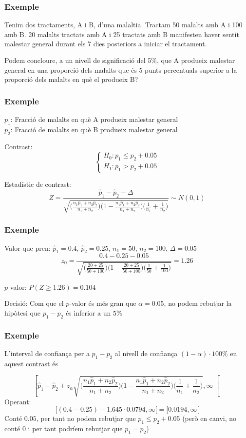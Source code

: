 \documentclass[12pt,t]{beamer}\usepackage[]{graphicx}\usepackage[]{color}
\renewcommand{\emph}[1]{{\color{red}#1}}
\renewcommand{\leq}{\leqslant}
\renewcommand{\geq}{\geqslant}
\theoremstyle{plain}
\theoremstyle{definition}
\begin{document}
\begin{frame}
\frametitle{Exemple}
Tenim dos tractaments, A i B, d'una malaltia. Tractam 50 malalts amb A i 100 amb B. 20 malalts  tractats amb A i 25 tractats amb B manifesten haver sentit malestar general durant els 7 dies posteriors a iniciar el tractament.
\medskip

Podem concloure, a un nivell de significació del 5\%, que A produeix malestar general en una proporció dels malalts que és 5 punts percentuals superior  a la proporció dels malalts en què el produeix B?

\end{frame}


\begin{frame}
\frametitle{Exemple}

$p_1$: Fracció de malalts en què A produeix malestar general\\
$p_2$: Fracció de malalts en què B produeix malestar general
\medskip

\emph{Contrast}:
$$
\left\{\begin{array}{l}
H_0:p_1\leq p_2+0.05\\
H_1:p_1>p_2+0.05
\end{array}\right.
$$

\emph{Estadístic de contrast}:
$$
Z=\frac{\widehat{p}_1 -\widehat{p}_2-\Delta}{
\sqrt{\Big(\frac{n_1 \widehat{p}_1 +n_2 \widehat{p}_2}{n_1
+n_2}\Big)\Big(1-\frac{n_1 \widehat{p}_1 +n_2 \widehat{p}_2}{n_1
+n_2}\Big)\Big(\frac{1}{n_1}+\frac{1}{n_2}
\Big)}}\sim N(0,1)
$$
\bigskip

\end{frame}
\begin{frame}
\frametitle{Exemple}


\emph{Valor que pren}: $\widehat{p}_1=0.4$, $\widehat{p}_2=0.25$, $n_1=50$, $n_2=100$, $\Delta=0.05$
$$
z_0=\frac{0.4 -0.25-0.05}{
\sqrt{\Big(\frac{20+25}{50+100}\Big)\Big(1-\frac{20+25}{50+100}\Big)\Big(\frac{1}{50}+\frac{1}{100}
\Big)}}
=1.26
$$
\medskip

\emph{$p$-valor}: $P(Z\geq 1.26)= 0.104$
\medskip

\emph{Decisió}: Com que el $p$-valor és més gran que $\alpha=0.05$, no podem rebutjar la hipòtesi que $p_1-p_2$ és inferior a un $5\%$

\end{frame}
\begin{frame}
\frametitle{Exemple}

L'\emph{interval de confiança} per a  $p_1-p_2$
al nivell de confiança $(1-\alpha)\cdot 100\%$ en aquest contrast és

{\footnotesize $$
\left[\widehat{p}_1-\widehat{p}_2+z_{\alpha}\sqrt{\Big(\frac{n_1 \widehat{p}_1 +n_2 \widehat{p}_2}{n_1
+n_2}\Big)\Big(1-\frac{n_1 \widehat{p}_1 +n_2 \widehat{p}_2}{n_1
+n_2}\Big)\Big(\frac{1}{n_1}+\frac{1}{n_2}
\Big)},\infty
\right[
$$
}
Operant:
$$
[(0.4-0.25)-1.645\cdot 0.0794,\infty [=[0.0194,\infty[
$$
Conté $0.05$, per tant no podem rebutjar que $p_1\leq p_2+ 0.05$ (però en canvi, no conté 0 i per tant podríem rebutjar que $p_1=p_2$)
\end{frame}
\end{document}
